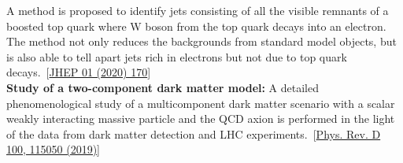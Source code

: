 \documentclass[a4paper,11pt]{article}
\begin{document}
{A method is proposed to identify jets consisting of all the visible remnants of a boosted top quark where W boson from the top quark decays into an electron. The method not only reduces the backgrounds from standard model objects, but is also able to tell apart jets rich in electrons but not due to top quark decays.~[\href{https://doi.org/10.1007/JHEP01(2020)170}{JHEP 01 (2020) 170}]\\
\textbf{Study of a two-component dark matter model:}
A detailed phenomenological study of a multicomponent dark matter scenario with a scalar weakly interacting massive particle and the QCD axion is performed in the light of the data from dark matter detection and LHC experiments.~[\href{https://doi.org/10.1103/PhysRevD.100.115050}{Phys. Rev. D 100, 115050 (2019)}]

}
\end{document}
